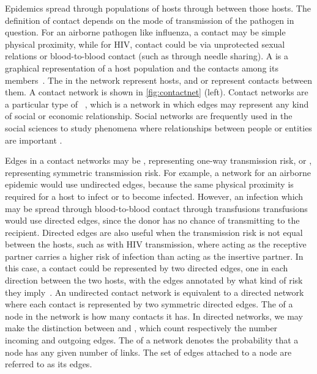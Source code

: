 Epidemics spread through populations of hosts through  between
those hosts. The definition of contact depends on the mode of transmission of
the pathogen in question. For an airborne pathogen like influenza, a contact
may be simple physical proximity, while for \gls{HIV}, contact could be via
unprotected sexual relations or blood-to-blood contact (such as through needle
sharing). A  is a graphical representation of a host
population and the contacts among its members~\autocite{klovdahl1985social,
morris1993epidemiology, keeling2005networks}. The  in the network
represent hosts, and  or  represent contacts between
them. A contact network is shown in \cref{fig:contactnet} (left). Contact
networks are a particular type of ~\autocite{moreno1953shall, barnes1954class}, which is a network in
which edges may represent any kind of social or economic relationship. Social
networks are frequently used in the social sciences to study phenomena where
relationships between people or entities are important \autocite[for a review
see][]{wasserman1994social}.

Edges in a contact networks may be , representing one-way
transmission risk, or , representing symmetric transmission
risk. For example, a network for an airborne epidemic would use undirected
edges, because the same physical proximity is required for a host to infect or
to become infected. However, an infection which may be spread through
blood-to-blood contact through transfusions transfusions would use directed
edges, since the donor has no chance of transmitting to the recipient. Directed
edges are also useful when the transmission risk is not equal between the
hosts, such as with HIV transmission, where acting as the receptive partner
carries a higher risk of infection than acting as the insertive partner. In
this case, a contact could be represented by two directed edges, one in each
direction between the two hosts, with the edges annotated by what kind of risk
they imply~\autocite{wasserman1994social}. An undirected contact network is
equivalent to a directed network where each contact is represented by two
symmetric directed edges. The  of a node in the network is how
many contacts it has. In directed networks, we may make the distinction between
 and , which count respectively the number
incoming and outgoing edges. The  of a network
denotes the probability that a node has any given number of links. The set of
edges attached to a node are referred to as its  edges.


